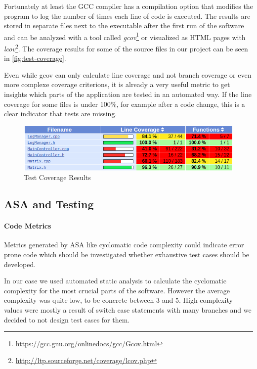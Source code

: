 \documentclass{scrreprt}
\begin{document}
Fortunately at least the GCC compiler has a compilation option that modifies the program to log the number of times each line of code is executed. The results are stored in separate files next to the executable after the first run of the software and can be analyzed with a tool called \textit{gcov}\footnote{\url{https://gcc.gnu.org/onlinedocs/gcc/Gcov.html}} or visualized as HTML pages with \textit{lcov}\footnote{\url{http://ltp.sourceforge.net/coverage/lcov.php}}. The coverage results for some of the source files in our project can be seen in \vref{fig:test-coverage}.

Even while gcov can only calculate line coverage and not branch coverage or even more complexe coverage criterions, it is already a very useful metric to get insights which parts of the application are tested in an automated way. If the line coverage for some files is under 100\%, for example after a code change, this is a clear indicator that tests are missing.

\begin{figure}[h]
	\centering
	\includegraphics[width=1.0\textwidth]{img/test-coverage}
	\caption[Test Coverage Results]{Test Coverage Results}
	\label{fig:test-coverage}
\end{figure}


\subsection{ASA and Testing}

\paragraph{Code Metrics} Metrics generated by ASA like cyclomatic code complexity could indicate error prone code which should be investigated whether exhaustive test cases should be developed.

In our case we used automated static analysis to calculate the cyclomatic complexity for the most crucial parts of the software. However the average complexity was quite low, to be concrete between 3 and 5. High complexity values were mostly a result of switch case statements with many branches and we decided to not design test cases for them.
\end{document}
